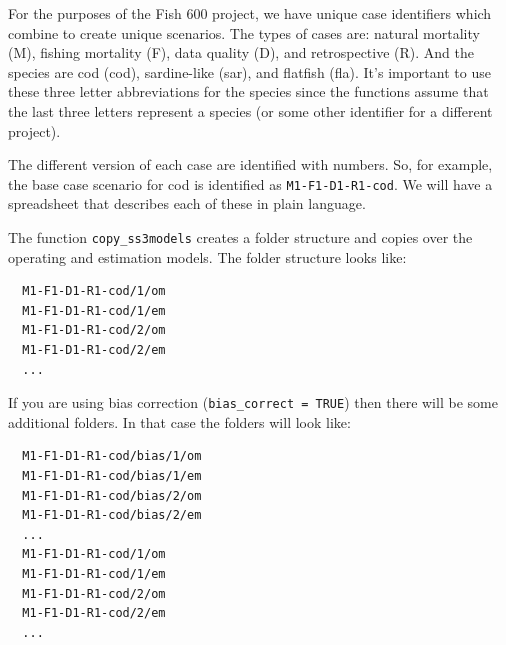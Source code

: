 \documentclass[12pt]{article}
\begin{document}
For the purposes of the Fish 600 project, we have unique case identifiers which 
combine to create unique scenarios. The types of cases are: natural mortality 
(M), fishing mortality (F), data quality (D), and retrospective (R). And the 
species are cod (cod), sardine-like (sar), and flatfish (fla). It's important 
to use these three letter abbreviations for the species since the functions 
assume that the last three letters represent a species (or some other 
identifier for a different project).

The different version of each case are identified with numbers. So, for 
example, the base case scenario for cod is identified as 
\texttt{M1-F1-D1-R1-cod}. We will have a spreadsheet that describes each of 
these in plain language.








The function \texttt{copy\_ss3models} creates a folder structure and copies 
over the operating and estimation models. The folder structure looks like:

\begin{verbatim}
  M1-F1-D1-R1-cod/1/om
  M1-F1-D1-R1-cod/1/em
  M1-F1-D1-R1-cod/2/om
  M1-F1-D1-R1-cod/2/em
  ...
\end{verbatim}

If you are using bias correction (\texttt{bias\_correct = TRUE}) then there 
will be some additional folders. In that case the folders will look like:

\begin{verbatim}
  M1-F1-D1-R1-cod/bias/1/om
  M1-F1-D1-R1-cod/bias/1/em
  M1-F1-D1-R1-cod/bias/2/om
  M1-F1-D1-R1-cod/bias/2/em
  ...
  M1-F1-D1-R1-cod/1/om
  M1-F1-D1-R1-cod/1/em
  M1-F1-D1-R1-cod/2/om
  M1-F1-D1-R1-cod/2/em
  ...
\end{verbatim}
\end{document}
